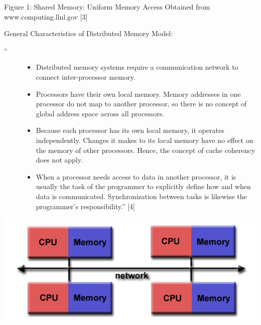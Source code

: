 \documentclass[letterpaper,10pt,openany,oneside]{sphinxmanual}
\begin{document}
\begin{center}Figure 1: Shared Memory: Uniform Memory Access Obtained from www.computing.llnl.gov {[}3{]}
\end{center}
General Characteristics of Distributed Memory Model:
\begin{description}
\item[{``}] \leavevmode\begin{itemize}
\item {} 
Distributed memory systems require a communication network to connect inter-processor memory.

\item {} 
Processors have their own local memory. Memory addresses in one processor do not map to another processor, so there is no concept of global address space across all processors.

\item {} 
Because each processor has its own local memory, it operates independently. Changes it makes to its local memory have no effect on the memory of other processors. Hence, the concept of cache coherency does not apply.

\item {} 
When a processor needs access to data in another processor, it is usually the task of the programmer to explicitly define how and when data is communicated. Synchronization between tasks is likewise the programmer's responsibility.'' {[}4{]}

\end{itemize}

\end{description}

{\hfill\includegraphics{DistributedMemory.png}\hfill}
\end{document}
